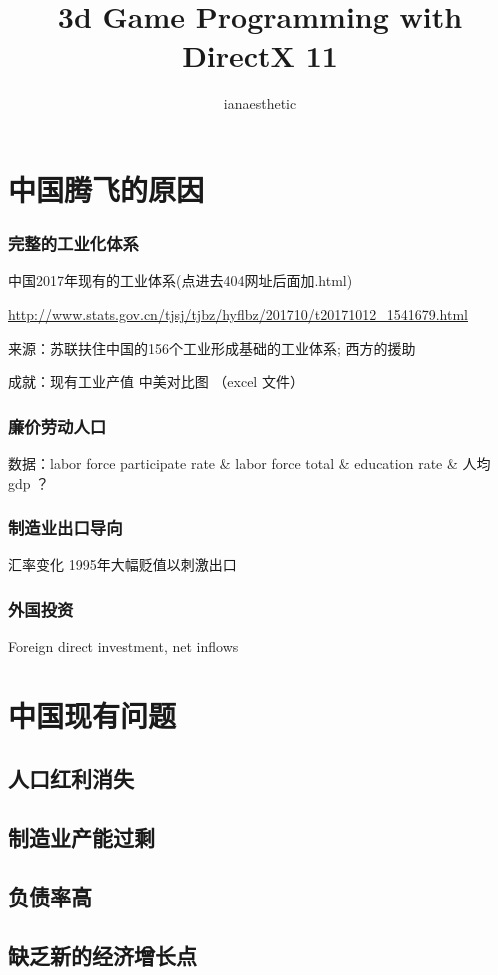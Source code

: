 \documentclass[10pt, a4paper]{article}
\author{ianaesthetic}
\title{3d Game Programming with DirectX 11}
\begin{document}
    \section{中国腾飞的原因}
        \subsubsection{完整的工业化体系}
            中国2017年现有的工业体系(点进去404网址后面加.html)

            \url{http://www.stats.gov.cn/tjsj/tjbz/hyflbz/201710/t20171012_1541679.html}
    
            来源：苏联扶住中国的156个工业形成基础的工业体系; 西方的援助
            
            成就：现有工业产值 中美对比图 （excel 文件）
        \subsubsection{廉价劳动人口}
            数据：labor force participate rate \& labor force total \& education rate \& 人均gdp ？ 

        \subsubsection{制造业出口导向}
            汇率变化 1995年大幅贬值以刺激出口
        \subsubsection{外国投资}
            Foreign direct investment, net inflows
\section{中国现有问题}
    \subsection{人口红利消失}
    \subsection{制造业产能过剩}
    \subsection{负债率高}
    \subsection{缺乏新的经济增长点}
\end{document}
